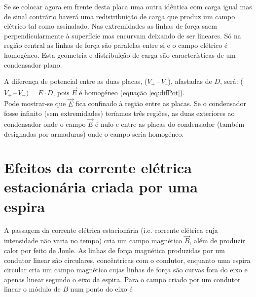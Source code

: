 \documentclass[a4paper,twoside,12pt]{article}      %
\begin{document}
Se se colocar agora em frente desta placa uma outra idêntica com carga igual mas de sinal contrário haverá uma redistribuição de carga que produz um campo elétrico tal como assinalado. Nas extremidades as linhas de força saem perpendicularmente à superfície mas encurvam deixando de ser lineares. Só na região central as linhas de força são paralelas entre si e o campo elétrico é homogéneo. Esta geometria e distribuição de carga são características de um condensador plano.

\setlength{\unitlength}{1.0cm} 
\begin{center}
\end{center}

A diferença de potencial entre as duas placas, ($V_+ \, – \, V_–$), afastadas de $D$, será: ($V_+ \,–\, V_-) = E\cdot D$, pois $\vec{E}$ é homogéneo (equação \ref{eq:difPot}).\\
Pode mostrar-se que $\vec{E}$ fica confinado à região entre as placas. Se o condensador fosse infinito (sem extremidades) teríamos três regiões, as duas exteriores ao condensador onde o campo  $\vec{E}$  é nulo  e entre as placas do condensador (também designadas por armaduras) onde o campo seria homogéneo.


\section{\sf Efeitos da corrente elétrica estacionária criada por uma \\ espira}
A passagem da corrente elétrica estacionária (i.e. corrente elétrica cuja intensidade não varia no tempo) cria um campo magnético $\vec{B}$, além de produzir calor por feito de Joule. As linhas de força magnética produzidas por um condutor linear são circulares, concêntricas com o condutor, enquanto uma espira circular cria um campo magnético cujas linhas de força são curvas fora do eixo e apenas linear segundo o eixo da espira. 
Para o campo criado por um condutor linear o módulo de $B$ num ponto do eixo é
\end{document}
